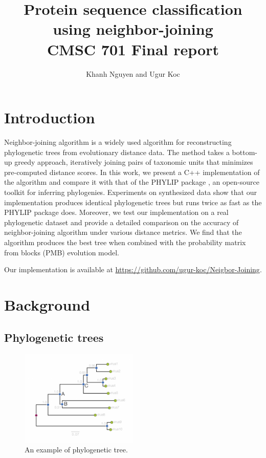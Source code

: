 \documentclass[11pt,letterpaper]{article}
\title{
Protein sequence classification using neighbor-joining\\
   CMSC 701 Final report
}
\author{
	Khanh Nguyen and Ugur Koc
}
\theoremstyle{definition}
\begin{document}
\maketitle

\section{Introduction}

Neighbor-joining algorithm \cite{saitou1987neighbor} is a widely used algorithm for reconstructing phylogenetic trees from evolutionary distance data. The method takes a bottom-up greedy approach, iteratively joining pairs of taxonomic units that minimizes pre-computed distance scores. In this work, we present a C++ implementation of the algorithm and compare it with that of the PHYLIP package \cite{felsenstein2005phylip}, an open-source toolkit for inferring phylogenies. Experiments on synthesized data show that our implementation produces identical phylogenetic trees but runs twice as fast as the PHYLIP package does. Moreover, we test our implementation on a real phylogenetic dataset and provide a detailed comparison on the accuracy of neighbor-joining algorithm under various distance metrics. We find that the algorithm produces the best tree when combined with the probability matrix from blocks (PMB) evolution model.

Our implementation is available at \url{https://github.com/ugur-koc/Neigbor-Joining}.

\section{Background}


\subsection{Phylogenetic trees}

\begin{figure}[t]
  \centering
  \includegraphics[width=0.5\textwidth]{phylogram_1a.png}
  \caption{An example of phylogenetic tree.}
  \label{fig:phytree}
\end{figure}
\end{document}
